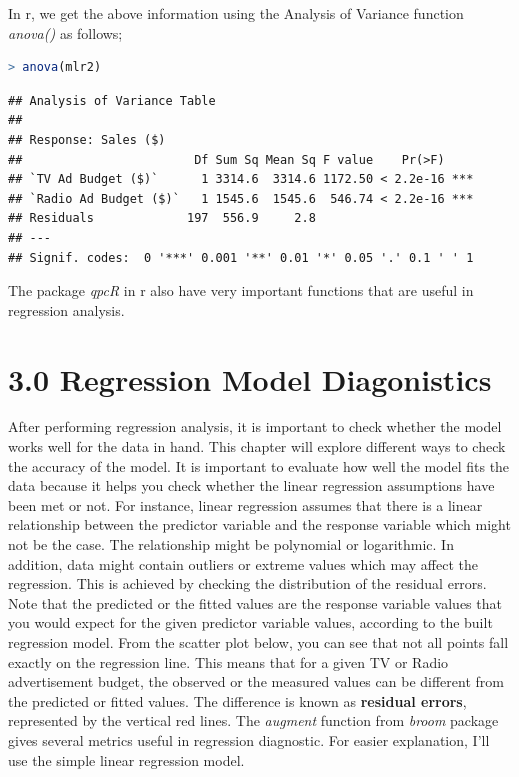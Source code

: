 \documentclass[
]{article}
\begin{document}
In r, we get the above information using the Analysis of Variance
function \emph{anova()} as follows;

\begin{lstlisting}[language=R]
> anova(mlr2)
\end{lstlisting}

\begin{lstlisting}
## Analysis of Variance Table
## 
## Response: Sales ($)
##                        Df Sum Sq Mean Sq F value    Pr(>F)    
## `TV Ad Budget ($)`      1 3314.6  3314.6 1172.50 < 2.2e-16 ***
## `Radio Ad Budget ($)`   1 1545.6  1545.6  546.74 < 2.2e-16 ***
## Residuals             197  556.9     2.8                      
## ---
## Signif. codes:  0 '***' 0.001 '**' 0.01 '*' 0.05 '.' 0.1 ' ' 1
\end{lstlisting}

The package \emph{qpcR} in r also have very important functions that are
useful in regression analysis.

\newpage

\hypertarget{regression-model-diagonistics}{%
\section{3.0 Regression Model
Diagonistics}\label{regression-model-diagonistics}}

After performing regression analysis, it is important to check whether
the model works well for the data in hand. This chapter will explore
different ways to check the accuracy of the model. It is important to
evaluate how well the model fits the data because it helps you check
whether the linear regression assumptions have been met or not. For
instance, linear regression assumes that there is a linear relationship
between the predictor variable and the response variable which might not
be the case. The relationship might be polynomial or logarithmic. In
addition, data might contain outliers or extreme values which may affect
the regression. This is achieved by checking the distribution of the
residual errors. Note that the predicted or the fitted values are the
response variable values that you would expect for the given predictor
variable values, according to the built regression model. From the
scatter plot below, you can see that not all points fall exactly on the
regression line. This means that for a given TV or Radio advertisement
budget, the observed or the measured values can be different from the
predicted or fitted values. The difference is known as \textbf{residual
errors}, represented by the vertical red lines. The \emph{augment}
function from \emph{broom} package gives several metrics useful in
regression diagnostic. For easier explanation, I'll use the simple
linear regression model.
\end{document}
